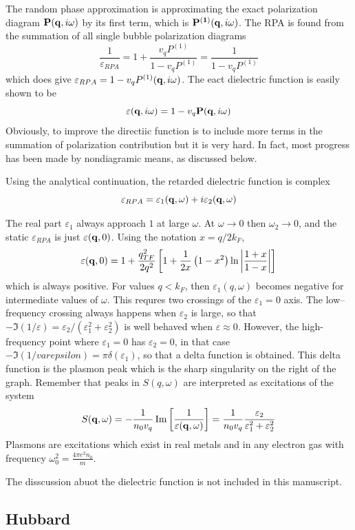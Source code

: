 The random phase approximation is approximating the exact polarization diagram $\mathbf{P}(\mathbf{q},i\omega)$ by its first term, which is $\mathbf{P^{(1)}}(\mathbf{q},i\omega)$.
The RPA is found from the summation of all single bubble polarization diagrams
\begin{equation}
    \frac{1}{\varepsilon_{RPA}} = 1 + \frac{v_q P^{(1)}}{1 - v_q P^{(1)}} = \frac{1}{1 - v_q P^{(1)}}   \label{5.161}
\end{equation}
which does give $\varepsilon_{RPA} = 1 - v_q P^{(1)}(\mathbf{q},i\omega)$.
The eact dielectric function is easily shown to be
\begin{equation}
    \varepsilon(\mathbf{q},i\omega) = 1 - v_q \mathbf{P}(\mathbf{q},i\omega)  \label{5.162}
\end{equation}
Obviously, to improve the directiic function is to include more terms in the summation of polarization contribution but it is very hard.
In fact, most progress has been made by nondiagramic means, as discussed below.

Using the analytical continuation, the retarded dielectric function is complex
\begin{equation}
    \varepsilon_{RPA} = \varepsilon_1(\mathbf{q},\omega) + i \varepsilon_2(\mathbf{q},\omega)    \label{5.163}
\end{equation}

The real part $\varepsilon_1$ always approach $1$ at large $\omega$.
At $\omega \to 0$ then $\omega_2 \to 0$, and the static $\varepsilon_{RPA}$ is just $\varepsilon(\mathbf{q},0)$.
Using the notation $x=q/2k_F$,
\begin{equation}
    \varepsilon(\mathbf{q},0) = 1 + \frac{q^2_{TF}}{2q^2} \left[ 1 + \frac{1}{2x} \left( 1 - x^2 \right) \ln \abs{ \frac{1+x}{1-x} } \right]   \label{5.166}
\end{equation}
which is always positive.
For values $q<k_F$, then $\varepsilon_1(q,\omega)$ becomes negative for intermediate values of $\omega$.
This requres two crossings of the $\varepsilon_1 = 0 $ axis.
The low--frequency crossing always happens when $\varepsilon_2$ is large, so that $-\Im (1/\varepsilon) = \varepsilon_2 / (\varepsilon_1^2 + \varepsilon_2^2 )$ is well behaved when $\varepsilon \approx 0$.
However, the high-frequency point where $\varepsilon_1=0$ has $\varepsilon_2=0$, in that case $ - \Im(1/varepsilon) = \pi \delta(\varepsilon_1)$, so that a delta function is obtained.
This delta function is the plasmon peak which is the sharp singularity on the right of the graph.
Remember that peaks in $S(q,\omega)$ are interpreted as excitations of the system
\begin{equation}
    S(\mathbf{q},\omega) = - \frac{1}{n_0 v_q} \Im \left[ \frac{1}{\varepsilon(\mathbf{q},\omega)} \right] = \frac{1}{n_0 v_q} \frac{\varepsilon_2}{\varepsilon_1^2 + \varepsilon_2^2}    \label{5.167}
\end{equation}
Plasmons are excitations which exist in real metals and in any electron gas with frequency $\omega^2_0 = \frac{4\pi e^2 n_0}{m}$.

The disscussion abuot the dielectric function is not included in this manuscript.

\subsection{Hubbard}
